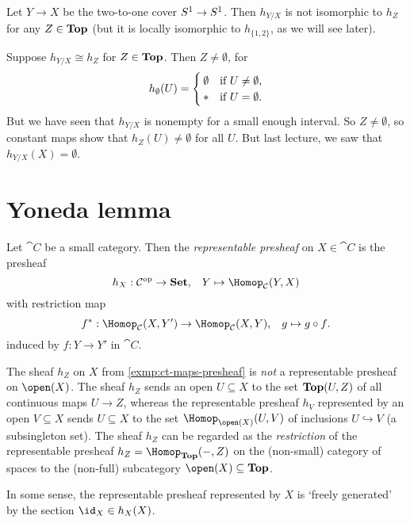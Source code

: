 \begin{exmp}
Let $Y\to X$ be the two-to-one cover $\sphere[1]\to\sphere[1]$.
Then $h_{Y/X}$ is not isomorphic to $h_Z$ for any $Z\in\mathbf{Top}$ (but it is locally isomorphic to $h_{\{1,2\}}$, as we will see later).

Suppose $h_{Y/X}\cong h_Z$ for $Z\in\mathbf{Top}$.
Then $Z\neq\emptyset$, for
\[ h_\emptyset(U) = \begin{cases}
    \emptyset & \text{if } U \neq\emptyset\text{,} \\
    {\mathord{*}} & \text{if } U =\emptyset\text{.}
\end{cases} \]
But we have seen that $h_{Y/X}$ is nonempty for a small enough interval.
So $Z\neq\emptyset$, so constant maps show that $h_Z(U)\neq\emptyset$ for all $U$.
But last lecture, we saw that $h_{Y/X}(X)=\emptyset$.
\end{exmp}

\section{Yoneda lemma}

\begin{defn}
Let $\cat C$ be a small category.
Then the \emph{representable presheaf} on $X\in\cat C$ is the presheaf
\[ h_X \colon \cat C\opp\to\catSet\text{,} \quad Y \mapsto \Hom[\cat C](Y,X) \]
with restriction map
\[ f^*\colon\Hom[\cat C](X,Y')\to\Hom[\cat C](X,Y)\text{,} \quad g\mapsto g\circ f\text{.} \]
induced by $f\colon Y\to Y'$ in $\cat C$.
\end{defn}

\begin{rmk}
The sheaf $h_Z$ on $X$ from \cref{exmp:ct-maps-presheaf} is \emph{not} a representable presheaf on $\open(X)$.
The sheaf $h_Z$ sends an open $U\subseteq X$ to the set $\cont(U,Z)$ of all continuous  maps $U\to Z$, whereas the representable presheaf $h_V$ represented by an open $V\subseteq X$ sends $U\subseteq X$ to the set $\Hom[\open(X)](U,V)$ of inclusions $U\hookrightarrow V$ (a subsingleton set).
The sheaf $h_Z$ can be regarded as the \emph{restriction} of the representable presheaf $h_Z = \Hom[\catTopologicalSpace](-,Z)$ on the (non-small) category of spaces to the (non-full) subcategory $\open(X)\subseteq\catTopologicalSpace$.
\end{rmk}

In some sense, the representable presheaf represented by $X$ is `freely generated' by the section $\id_X\in h_X(X)$.

